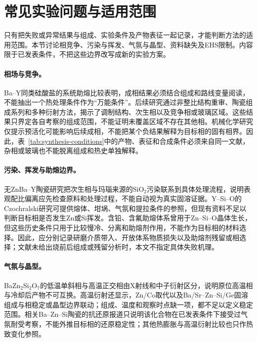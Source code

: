 \section{常见实验问题与适用范围}
\label{sec:failure-boundaries}

只有把失败或异常结果与组成、实验条件及产物表征一起记录，才能判断方法的适用范围。本节讨论相竞争、污染与挥发、气氛与晶型、资料缺失及EHS限制。内容限于已发表条件，不把这些边界改写成新的实验方案。

\paragraph{相场与竞争。}
Ba--Y同类硅酸盐的系统助熔比较表明，成相结果必须结合组成和路线变量阅读，不能抽出一个热处理条件作为“万能条件”\cite{wierzbickawieczorek2017high}。后续研究通过非整比结构重审、陶瓷组成系列和多种衍射方法，揭示了调制结构、次生相以及竞争相或玻璃区域\cite{yamane2024synthesis,yamane2024microstructure,gulay2024navigation}。这些结果只界定各自考察的组成范围，不能证明未覆盖区域不存在其他相。机械化学研究仅提示预活化可能影响后续成相，不能把某个负结果解释为目标相的固有相界\cite{tzvetkov2001effects}。因此，表~\ref{tab:synthesis-conditions}中的产物、表征和合成条件必须来自同一文献，杂相或玻璃也不能脱离组成和热史单独解释。

\paragraph{污染、挥发与助熔边界。}
无ZnBa--Y陶瓷研究把次生相与玛瑙来源的\(\mathrm{SiO_2}\)污染联系到具体处理流程，说明表观配比偏离应先检查原料和处理过程，不能自动视为真实固溶证据\cite{yamane2024microstructure}。Y--Si--O的Czochralski研究可提供熔体、坩埚、气氛和提拉条件的参照，但现有资料不足以判断目标相是否发生Zn或Si挥发\cite{shoudu1999czochralski}。含铅、含氟助熔体系曾用于Zn--Si--O晶体生长，但这些历史条件只用于比较慢冷、分离和助熔剂作用，不能作为目标相的材料选择\cite{giess1982zn2sio4}。因此，应分别记录研磨介质带入、开放体系物质损失以及助熔剂残留或相选择；文献未给出烧前后组成或残留分析时，本文不指定具体失败机理。

\paragraph{气氛与晶型。}
BaZn$_2$Si$_2$O$_7$的低温单斜相与高温正交相由X射线和中子衍射区分，说明原位高温相与冷却后产物不可互换\cite{lin1999phase}。高温衍射还显示，Zn/Co取代以及Ba/Sr--Zn--Si/Ge固溶组成与相稳定或晶型边界联动；组成、温度和观察时点缺一项，都不足以定义稳定范围\cite{kerstan2013bazn2si2o7,thieme2016negative}。相关Ba--Zn--Si陶瓷的抗还原报道只说明该化合物在已发表条件下接受过气氛耐受考察，不能外推目标相的还原稳定性\cite{zou2019anti}；其他热膨胀与高温衍射比较也只作热致变化参照\cite{kerstan2012thermal}。

